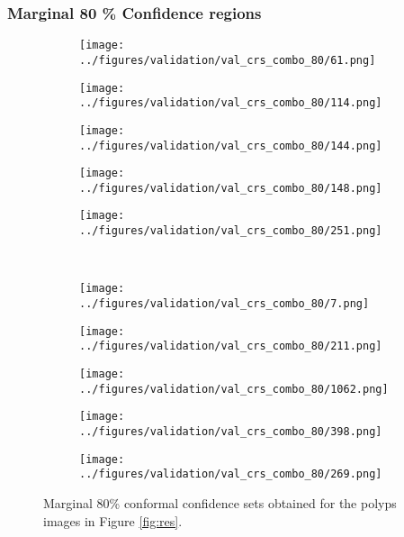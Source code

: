 \subsubsection{Marginal 80 \% Confidence regions}
\begin{figure}[h!]
	\begin{subfigure}{0.19\textwidth}
		\centering
		\texttt{[image: ../figures/validation/val\_crs\_combo\_80/61.png]}
		\label{fig:1}
	\end{subfigure}
	\begin{subfigure}{0.19\textwidth}
		\centering
		\texttt{[image: ../figures/validation/val\_crs\_combo\_80/114.png]}
		\label{fig:1}
	\end{subfigure}
	\begin{subfigure}{0.19\textwidth}
		\centering
		\texttt{[image: ../figures/validation/val\_crs\_combo\_80/144.png]}
		\label{fig:1}
	\end{subfigure}
	\begin{subfigure}{0.19\textwidth}
		\centering
		\texttt{[image: ../figures/validation/val\_crs\_combo\_80/148.png]}
		\label{fig:1}
	\end{subfigure}
	\begin{subfigure}{0.19\textwidth}
		\centering
		\texttt{[image: ../figures/validation/val\_crs\_combo\_80/251.png]}
		\label{fig:1}
	\end{subfigure}
	\vspace{-0.35cm}
	\\
	\begin{subfigure}{0.19\textwidth}
		\centering
		\texttt{[image: ../figures/validation/val\_crs\_combo\_80/7.png]}
		\label{fig:1}
	\end{subfigure}
	\begin{subfigure}{0.19\textwidth}
		\centering
		\texttt{[image: ../figures/validation/val\_crs\_combo\_80/211.png]}
		\label{fig:1}
	\end{subfigure}
	\begin{subfigure}{0.19\textwidth}
		\centering
		\texttt{[image: ../figures/validation/val\_crs\_combo\_80/1062.png]}
		\label{fig:1}
	\end{subfigure}
	\begin{subfigure}{0.19\textwidth}
		\centering
		\texttt{[image: ../figures/validation/val\_crs\_combo\_80/398.png]}
		\label{fig:1}
	\end{subfigure}
	\begin{subfigure}{0.19\textwidth}
		\centering
		\texttt{[image: ../figures/validation/val\_crs\_combo\_80/269.png]}
		\label{fig:1}
	\end{subfigure}
	\label{fig:grid}
	\caption{Marginal 80\% conformal confidence sets obtained for the polyps images in Figure \ref{fig:res}.}\label{fig:joint2}
\end{figure}
